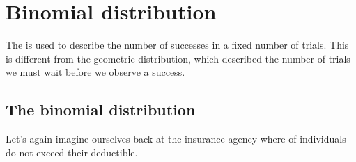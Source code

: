 \section{Binomial distribution}
\label{binomialModel}


The 
is used to describe
the number of successes in a fixed number of trials.
This is different from the geometric distribution,
which described the number of trials we must wait before
we observe a success.


\subsection{The binomial distribution}

\newcommand{\insureS}{\resp{not}}
\newcommand{\insureF}{\resp{exceed}}
\newcommand{\insureBinomCinDSingleScenario}{0.103}
\newcommand{\insureBinomCinD}{0.412}
\newcommand{\insureBinomEinHSingleScenario}{0.00454}
\newcommand{\insureBinomEinH}{0.254}
\newcommand{\insureBinomFourtyExpValue}{28}
\newcommand{\insureBinomFourtySD}{2.9}
\newcommand{\insureBinomFourtyLower}{22}
\newcommand{\insureBinomFourtyUpper}{34}

\noindent%
Let's again imagine ourselves back at the insurance agency
where \insureSperc{} of individuals do not exceed their
deductible.

